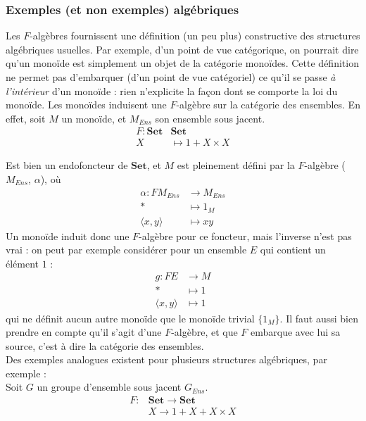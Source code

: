 \documentclass{article}
\begin{document}
\begin{center}
\end{center}

 
\subsubsection{Exemples (et non exemples) algébriques}
 
    Les $F$-algèbres fournissent une définition (un peu plus) constructive des structures algébriques usuelles. Par exemple, d'un point de vue catégorique, on pourrait dire qu'un monoïde est simplement un objet de la catégorie monoïdes. Cette définition ne permet pas d'embarquer (d'un point de vue catégoriel) ce qu'il se passe \textit{à l'intérieur} d'un monoïde : rien n'explicite la façon dont se comporte la loi du monoïde. Les monoïdes induisent une $F$-algèbre sur la catégorie des ensembles. En effet, soit $M$ un monoïde, et $ M_{Ens}$ son ensemble sous jacent.  
\begin{align*}
    F : \mathbf{Set} & \mathbf{Set} \\
    X & \mapsto 1 + X \times X
\end{align*}

Est bien un endofoncteur de $\mathbf{Set}$, et $M$ est pleinement défini par la $F$-algèbre ($M_{Ens}$, $\alpha$), où 
\begin{align*}
    \alpha : FM_{Ens} & \rightarrow M_{Ens} \\ 
                * & \mapsto 1_M \\ 
                \langle x, y \rangle & \mapsto xy
\end{align*}    
Un monoïde induit donc une $F$-algèbre pour ce foncteur, mais l'inverse n'est pas vrai : on peut par exemple considérer pour un ensemble $E$ qui contient un élément $1$ :
\begin{align*}
    g : F E & \rightarrow M \\
     * & \mapsto 1 \\ 
     \langle x,y \rangle & \mapsto 1 
\end{align*}
qui ne définit aucun autre monoïde que le monoïde trivial $\{ 1_M \} $. Il faut aussi bien prendre en compte qu'il s'agit d'une $F$-algèbre, et que $F$ embarque avec lui sa source, c'est à dire la catégorie des ensembles. 
\\ 
Des exemples analogues existent pour plusieurs structures algébriques, par exemple : 
\\
Soit $G$ un groupe d'ensemble sous jacent $G_{Ens}$.
\begin{align*}
    F :&  \mathbf{Set}  \rightarrow \mathbf{Set}\\
      & X  \rightarrow 1 + X + X \times X
\end{align*}
\end{document}
